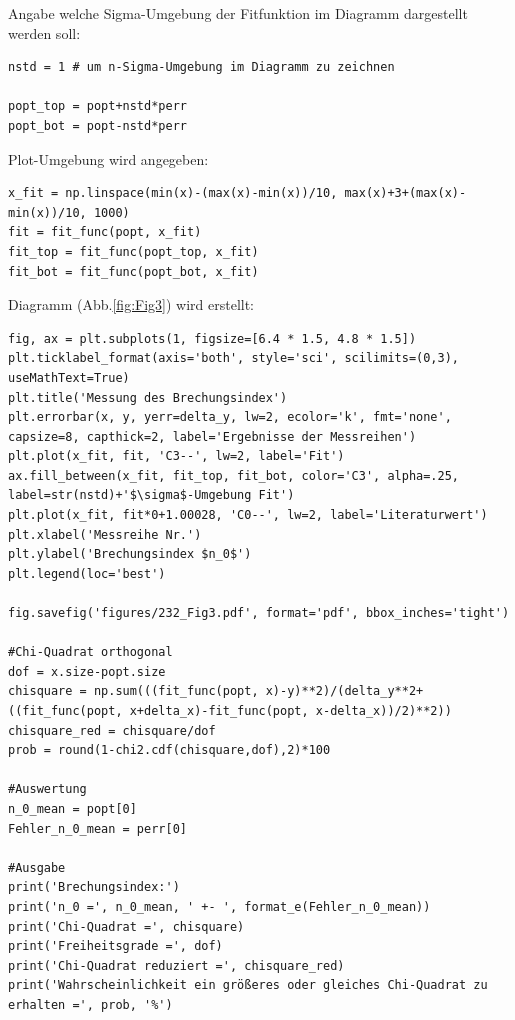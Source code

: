 \documentclass[a4paper,10pt]{article}
\begin{document}
Angabe welche Sigma-Umgebung der Fitfunktion im Diagramm dargestellt werden soll:\begin{lstlisting}
nstd = 1 # um n-Sigma-Umgebung im Diagramm zu zeichnen

popt_top = popt+nstd*perr
popt_bot = popt-nstd*perr

\end{lstlisting}

Plot-Umgebung wird angegeben:\begin{lstlisting}
x_fit = np.linspace(min(x)-(max(x)-min(x))/10, max(x)+3+(max(x)-min(x))/10, 1000)
fit = fit_func(popt, x_fit)
fit_top = fit_func(popt_top, x_fit)
fit_bot = fit_func(popt_bot, x_fit)

\end{lstlisting}

Diagramm (Abb.\ref{fig:Fig3}) wird erstellt:\begin{lstlisting}
fig, ax = plt.subplots(1, figsize=[6.4 * 1.5, 4.8 * 1.5])
plt.ticklabel_format(axis='both', style='sci', scilimits=(0,3), useMathText=True)
plt.title('Messung des Brechungsindex')
plt.errorbar(x, y, yerr=delta_y, lw=2, ecolor='k', fmt='none', capsize=8, capthick=2, label='Ergebnisse der Messreihen')
plt.plot(x_fit, fit, 'C3--', lw=2, label='Fit')
ax.fill_between(x_fit, fit_top, fit_bot, color='C3', alpha=.25, label=str(nstd)+'$\sigma$-Umgebung Fit')
plt.plot(x_fit, fit*0+1.00028, 'C0--', lw=2, label='Literaturwert')
plt.xlabel('Messreihe Nr.')
plt.ylabel('Brechungsindex $n_0$')
plt.legend(loc='best')

fig.savefig('figures/232_Fig3.pdf', format='pdf', bbox_inches='tight')

#Chi-Quadrat orthogonal
dof = x.size-popt.size
chisquare = np.sum(((fit_func(popt, x)-y)**2)/(delta_y**2+((fit_func(popt, x+delta_x)-fit_func(popt, x-delta_x))/2)**2))
chisquare_red = chisquare/dof
prob = round(1-chi2.cdf(chisquare,dof),2)*100

#Auswertung
n_0_mean = popt[0]
Fehler_n_0_mean = perr[0]

#Ausgabe
print('Brechungsindex:')
print('n_0 =', n_0_mean, ' +- ', format_e(Fehler_n_0_mean))
print('Chi-Quadrat =', chisquare)
print('Freiheitsgrade =', dof)
print('Chi-Quadrat reduziert =', chisquare_red)
print('Wahrscheinlichkeit ein größeres oder gleiches Chi-Quadrat zu erhalten =', prob, '%')

\end{lstlisting}
\end{document}

